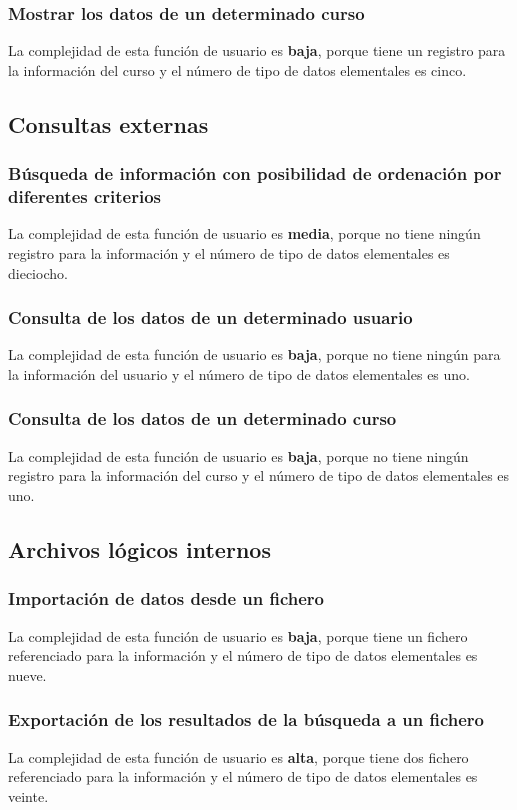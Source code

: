 \documentclass[11pt,a4paper,spanish,twoside]{book}
\begin{document}
\subsubsection{Mostrar los datos de un determinado curso}
La complejidad de esta función de usuario es \textbf{baja}, porque tiene un
registro para la información del curso y el número de tipo de datos
elementales es cinco.

\subsection{Consultas externas}
\subsubsection{Búsqueda de información con posibilidad de ordenación por
  diferentes criterios}
La complejidad de esta función de usuario es \textbf{media}, porque no tiene
ningún registro para la información y el número de tipo de datos elementales
es dieciocho.

\subsubsection{Consulta de los datos de un determinado usuario}
La complejidad de esta función de usuario es \textbf{baja}, porque no tiene
ningún para la información del usuario y el número de tipo de datos
elementales es uno.

\subsubsection{Consulta de los datos de un determinado curso}
La complejidad de esta función de usuario es \textbf{baja}, porque no tiene
ningún registro para la información del curso y el número de tipo de datos
elementales es uno.

\subsection{Archivos lógicos internos}
\subsubsection{Importación de datos desde un fichero}
La complejidad de esta función de usuario es \textbf{baja}, porque tiene un
fichero referenciado para la información y el número de tipo de datos
elementales es nueve.

\subsubsection{Exportación de los resultados de la búsqueda a un fichero}
La complejidad de esta función de usuario es \textbf{alta}, porque tiene dos
fichero referenciado para la información y el número de tipo de datos
elementales es veinte.
\end{document}
